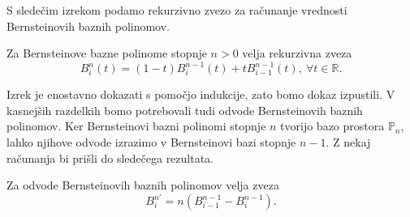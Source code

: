 \documentclass[isrm2, tisk]{fmfdelo}
\newcommand{\R}{\mathbb R}
\begin{document}
    S sledečim izrekom podamo rekurzivno zvezo za računanje vrednosti Bernsteinovih baznih polinomov.
    \begin{izrek}
        \label{izrek:bernsteinovi_lastnosti:rekruzija}
        Za Bernsteinove bazne polinome stopnje $n>0$ velja rekurzivna zveza
        \[B_i^n(t) = (1-t)B_i^{n-1}(t) + tB_{i-1}^{n-1}(t),\ \forall t\in\R.\]
    \end{izrek}
    Izrek je enostavno dokazati s pomočjo indukcije, zato bomo dokaz izpustili.
    V kasnejših razdelkih bomo potrebovali tudi odvode Bernsteinovih baznih polinomov.
    Ker Bernsteinovi bazni polinomi stopnje $n$ tvorijo bazo prostora $\mathbb{P}_n$, lahko njihove odvode izrazimo v Bernsteinovi bazi stopnje $n-1$.
    Z nekaj računanja bi prišli do sledečega rezultata.
    \begin{izrek}\label{izrek:bernstein-odvod}
        Za odvode Bernsteinovih baznih polinomov velja zveza
        \[B_{i}^{n\prime}=n(B_{i-1}^{n-1} - B_{i}^{n-1}).\]
    \end{izrek}
\end{document}
